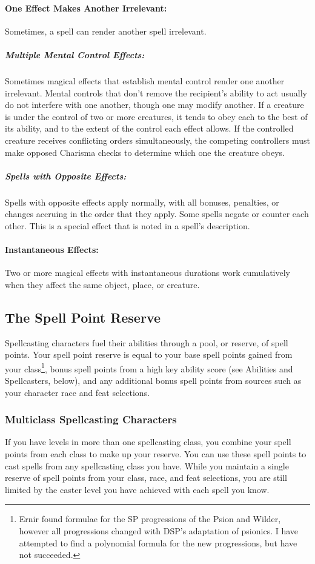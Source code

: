 \documentclass[../VancianToPsionics.tex]{subfiles}
\begin{document}
\paragraph{One Effect Makes Another Irrelevant:} Sometimes, a spell can render another spell irrelevant.

\subparagraph{Multiple Mental Control Effects:} Sometimes magical effects that establish mental control render one another irrelevant. Mental controls that don't remove the recipient's ability to act usually do not interfere with one another, though one may modify another. If a creature is under the control of two or more creatures, it tends to obey each to the best of its ability, and to the extent of the control each effect allows. If the controlled creature receives conflicting orders simultaneously, the competing controllers must make opposed Charisma checks to determine which one the creature obeys.

\subparagraph{Spells with Opposite Effects:} Spells with opposite effects apply normally, with all bonuses, penalties, or changes accruing in the order that they apply. Some spells negate or counter each other. This is a special effect that is noted in a spell's description.

\paragraph{Instantaneous Effects:} Two or more magical effects with instantaneous durations work cumulatively when they affect the same object, place, or creature.

\subsection{The Spell Point Reserve}
Spellcasting characters fuel their abilities through a pool, or reserve, of spell points. Your spell point reserve is equal to your base spell points gained from your class\footnote{Ernir found formulae for the SP progressions of the Psion and Wilder, however all progressions changed with DSP's adaptation of psionics. I have attempted to find a polynomial formula for the new progressions, but have not succeeded.}, bonus spell points from a high key ability score (see Abilities and Spellcasters, below), and any additional bonus spell points from sources such as your character race and feat selections.

\subsubsection{Multiclass Spellcasting Characters}
If you have levels in more than one spellcasting class, you combine your spell points from each class to make up your reserve. You can use these spell points to cast spells from any spellcasting class you have. While you maintain a single reserve of spell points from your class, race, and feat selections, you are still limited by the caster level you have achieved with each spell you know. 
\end{document}
